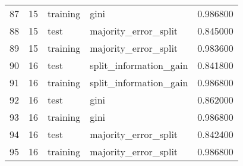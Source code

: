 \begin{tabular}{lrllr}
87 & 15 & training & gini & 0.986800 \\
88 & 15 & test & majority_error_split & 0.845000 \\
89 & 15 & training & majority_error_split & 0.983600 \\
90 & 16 & test & split_information_gain & 0.841800 \\
91 & 16 & training & split_information_gain & 0.986800 \\
92 & 16 & test & gini & 0.862000 \\
93 & 16 & training & gini & 0.986800 \\
94 & 16 & test & majority_error_split & 0.842400 \\
95 & 16 & training & majority_error_split & 0.986800 \\
\end{tabular}

